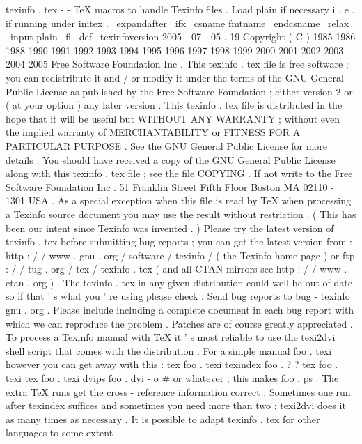 %
texinfo
.
tex
-
-
TeX
macros
to
handle
Texinfo
files
.
%
%
Load
plain
if
necessary
i
.
e
.
if
running
under
initex
.
\
expandafter
\
ifx
\
csname
fmtname
\
endcsname
\
relax
\
input
plain
\
fi
%
\
def
\
texinfoversion
{
2005
-
07
-
05
.
19
}
%
%
Copyright
(
C
)
1985
1986
1988
1990
1991
1992
1993
1994
1995
%
1996
1997
1998
1999
2000
2001
2002
2003
2004
2005
Free
Software
%
Foundation
Inc
.
%
%
This
texinfo
.
tex
file
is
free
software
;
you
can
redistribute
it
and
/
or
%
modify
it
under
the
terms
of
the
GNU
General
Public
License
as
%
published
by
the
Free
Software
Foundation
;
either
version
2
or
(
at
%
your
option
)
any
later
version
.
%
%
This
texinfo
.
tex
file
is
distributed
in
the
hope
that
it
will
be
%
useful
but
WITHOUT
ANY
WARRANTY
;
without
even
the
implied
warranty
%
of
MERCHANTABILITY
or
FITNESS
FOR
A
PARTICULAR
PURPOSE
.
See
the
GNU
%
General
Public
License
for
more
details
.
%
%
You
should
have
received
a
copy
of
the
GNU
General
Public
License
%
along
with
this
texinfo
.
tex
file
;
see
the
file
COPYING
.
If
not
write
%
to
the
Free
Software
Foundation
Inc
.
51
Franklin
Street
Fifth
Floor
%
Boston
MA
02110
-
1301
USA
.
%
%
As
a
special
exception
when
this
file
is
read
by
TeX
when
processing
%
a
Texinfo
source
document
you
may
use
the
result
without
%
restriction
.
(
This
has
been
our
intent
since
Texinfo
was
invented
.
)
%
%
Please
try
the
latest
version
of
texinfo
.
tex
before
submitting
bug
%
reports
;
you
can
get
the
latest
version
from
:
%
http
:
/
/
www
.
gnu
.
org
/
software
/
texinfo
/
(
the
Texinfo
home
page
)
or
%
ftp
:
/
/
tug
.
org
/
tex
/
texinfo
.
tex
%
(
and
all
CTAN
mirrors
see
http
:
/
/
www
.
ctan
.
org
)
.
%
The
texinfo
.
tex
in
any
given
distribution
could
well
be
out
%
of
date
so
if
that
'
s
what
you
'
re
using
please
check
.
%
%
Send
bug
reports
to
bug
-
texinfo
gnu
.
org
.
Please
include
including
a
%
complete
document
in
each
bug
report
with
which
we
can
reproduce
the
%
problem
.
Patches
are
of
course
greatly
appreciated
.
%
%
To
process
a
Texinfo
manual
with
TeX
it
'
s
most
reliable
to
use
the
%
texi2dvi
shell
script
that
comes
with
the
distribution
.
For
a
simple
%
manual
foo
.
texi
however
you
can
get
away
with
this
:
%
tex
foo
.
texi
%
texindex
foo
.
?
?
%
tex
foo
.
texi
%
tex
foo
.
texi
%
dvips
foo
.
dvi
-
o
#
or
whatever
;
this
makes
foo
.
ps
.
%
The
extra
TeX
runs
get
the
cross
-
reference
information
correct
.
%
Sometimes
one
run
after
texindex
suffices
and
sometimes
you
need
more
%
than
two
;
texi2dvi
does
it
as
many
times
as
necessary
.
%
%
It
is
possible
to
adapt
texinfo
.
tex
for
other
languages
to
some
%
extent
